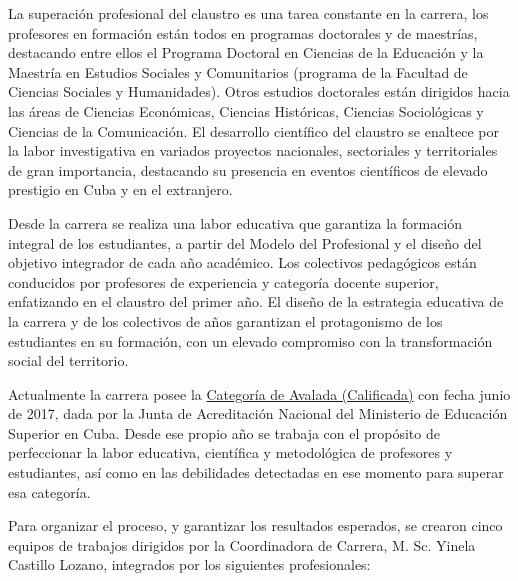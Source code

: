 La superación profesional del claustro es una tarea constante en la carrera, los profesores en formación están todos en programas doctorales y de maestrías, destacando entre ellos el Programa Doctoral en Ciencias de la Educación y la Maestría en Estudios Sociales y Comunitarios (programa de la Facultad de Ciencias Sociales y Humanidades). Otros estudios doctorales están dirigidos hacia las áreas de Ciencias Económicas, Ciencias Históricas, Ciencias Sociológicas y Ciencias de la Comunicación. El desarrollo científico del claustro se enaltece por la labor investigativa en variados proyectos nacionales, sectoriales y territoriales de gran importancia, destacando su presencia en eventos científicos de elevado prestigio en Cuba y en el extranjero.

Desde la carrera se realiza una labor educativa que garantiza la formación integral de los estudiantes, a partir del Modelo del Profesional y el diseño del objetivo integrador de cada año académico. Los colectivos pedagógicos están conducidos por profesores de experiencia y categoría docente superior, enfatizando en el claustro del primer año. El diseño de la estrategia educativa de la carrera y de los colectivos de años garantizan el protagonismo de los estudiantes en su formación, con un elevado compromiso con la transformación social del territorio.

Actualmente la carrera posee la \underline{Categoría de Avalada (Calificada)} con fecha junio de 2017, dada por la Junta de Acreditación Nacional del Ministerio de Educación Superior en Cuba. Desde ese propio año se trabaja con el propósito de perfeccionar la labor educativa, científica y metodológica de profesores y estudiantes, así como en las debilidades detectadas en ese momento para superar esa categoría. 

Para organizar el proceso, y garantizar los resultados esperados, se crearon cinco equipos de trabajos dirigidos por la Coordinadora de Carrera, M. Sc. Yinela Castillo Lozano, integrados por los siguientes profesionales:

\vspace*{2cm} 


